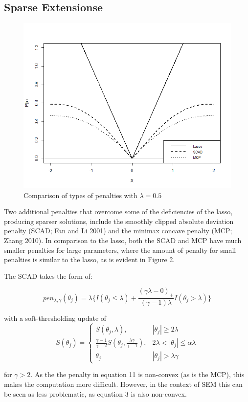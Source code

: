 \subsection{Sparse Extensionse}\label{sparse-extensionse}

\begin{figure}
    \centering
    \includegraphics[width=.5\linewidth]{figs/penalties}
    \caption{Comparison of types of penalties with $\lambda=0.5$}
\end{figure}

Two additional penalties that overcome some of the deficiencies of the
lasso, producing sparser solutions, include the smoothly clipped
absolute deviation penalty (SCAD; Fan and Li 2001) and the minimax
concave penalty (MCP; Zhang 2010). In comparison to the lasso, both the
SCAD and MCP have much smaller penalties for large parameters, where the
amount of penalty for small penalties is similar to the lasso, as is
evident in Figure 2.

The SCAD takes the form of:

\[
pen_{\lambda,\gamma}(\theta_{j}) = \lambda \big\{I(\theta_{j}\leq\lambda) + \frac{(\gamma \lambda-0)_{+}}{(\gamma-1)\lambda}I(\theta_{j}>\lambda)\big\}
\]

with a soft-thresholding update of \[
S(\theta_{j})= 
\begin{cases}
S(\theta_{j},\lambda),&  |\theta_{j}| \geq 2\lambda\\
\frac{\gamma-1}{\gamma-2}S(\theta_{j},\frac{\lambda\gamma}{\gamma-1}),              & 2\lambda < |\theta_{j}|\leq\alpha\lambda\\
\theta_{j} & |\theta_{j}| > \lambda \gamma
\end{cases}
\]

for \(\gamma > 2\). As the the penalty in equation 11 is non-convex (as
is the MCP), this makes the computation more difficult. However, in the
context of SEM this can be seen as less problematic, as equation 3 is
also non-convex.

